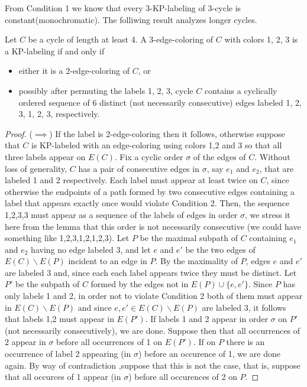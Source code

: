 \documentclass[12pt,a4paper,titlepage,openany]{report}
\begin{document}
From Condition 1 we know that every 3-KP-labeling of 3-cycle is constant(monochromatic). The folliwing result analyzes longer cycles.
\begin{lemma}\label{123123}
Let $C$ be a cycle of length at least 4. A 3-edge-coloring of $C$ with colors 1, 2, 3 is a KP-labeling if and only if
\begin{itemize}
\item either it is a 2-edge-coloring of $C$, or
\item possibly after permuting the labels 1, 2, 3, cycle $C$ contains a cyclically ordered sequence
of 6 distinct (not necessarily consecutive) edges labeled 1, 2, 3, 1, 2, 3, respectively. 
\end{itemize}
\end{lemma}

\begin{proof}
($\implies$) If the label is 2-edge-coloring then it follows, otherwise suppose that $C$ is KP-labeled with an edge-coloring using colors 1,2 and 3 so that all three labels appear on $E(C)$. Fix a cyclic order $\sigma$ of the edges of $C$. Without loss of generality, $C$ has a pair of consecutive edges in $\sigma$, say $e_1$ and $e_2$, that are labeled 1 and 2 respectively. Each label must appear at least twice on $C$, since otherwise the endpoints of a path formed by two consecutive edges containing a label that appears exactly once would violate Condition 2. Then, the sequence 1,2,3,3 must appear as a sequence of the labels of edges in order $\sigma$, we stress it here from the lemma that this order is not necessarily consecutive (we could have something like 1,2,3,1,2,1,2,3). Let $P$ be the maximal subpath of $C$ containing $e_1$ and $e_2$ having no edge labeled 3, and let $e$ and $e'$ be the two edges of $E(C)\backslash E(P)$ incident to an edge in $P$. By the maximality of $P$, edges $e$ and $e'$ are labeled 3 and, since each each label appears twice they must be distinct. Let $P'$ be the subpath of $C$ formed by the edges not in $E(P)\cup \{ e,e'\}$. Since $P$ has only labels 1 and 2, in order not to violate Condition 2 both of them must appear in $E(C)\backslash E(P)$ and since $e,e' \in E(C)\backslash E(P)$ are labeled 3, it follows that labels 1,2 must appear in $E(P')$. If labels 1 and 2 appear in order $\sigma$ on $P'$ (not necessarily consecutively), we are done. Suppose then that all occurrences of 2 appear in $\sigma$ before all occurrences of 1 on $E(P')$. If on $P$ there is an occurrence of label 2 appearing (in $\sigma$) before an occurence of 1, we are done again. By way of contradiction  ,suppose that this is not the case, that is, suppose that all occurces of 1 appear (in $\sigma$) before all occurences of 2 on $P$. \newline

\end{proof}
\end{document}

